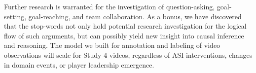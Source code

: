 Further research is warranted for the investigation of question-asking, goal-setting, goal-reaching, and team collaboration. As a bonus, we have discovered that the stop-words not only hold potential research investigation for the logical flow of such arguments, but can possibly yield new insight into causal inference and reasoning. The model we built for annotation and labeling of video observations will scale for Study 4 videos, regardless of ASI interventions, changes in domain events, or player leadership emergence.

